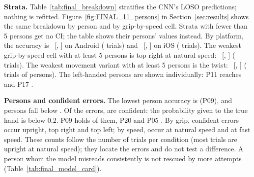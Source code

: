 \textbf{Strata.}
Table~\ref{tab:final_breakdown} stratifies the CNN's LOSO predictions; nothing is refitted.
Figure~\ref{fig:FINAL_11_persons} in Section~\ref{sec:results} shows the same breakdown by person and by grip-by-speed cell.
Strata with fewer than 5 persons get no CI; the table shows their persons' values instead.
By platform, the accuracy is ~[, ] on Android ( trials) and ~[, ] on iOS ( trials).
The weakest grip-by-speed cell with at least 5 persons is top right at natural speed: ~[, ] ( trials).
The weakest movement variant with at least 5 persons is the twist: ~[, ] ( trials of  persons).
The  left-handed persons are shown individually: P11 reaches  and P17 .

\textbf{Persons and confident errors.}
The lowest person accuracy is  (P09), and  persons fall below .
Of the  errors,  are confident: the probability given to the true hand is below 0.2.
P09 holds  of them, P20  and P05 .
By grip,  confident errors occur upright,  top right and  top left; by speed,  occur at natural speed and  at fast speed.
These counts follow the number of trials per condition (most trials are upright at natural speed); they locate the errors and do not test a difference.
A person whom the model misreads consistently is not rescued by more attempts (Table~\ref{tab:final_model_card}).

